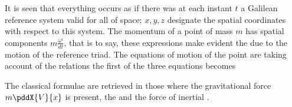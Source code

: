 It is seen that everything occurs as if there was at each instant $t$ a Galilean reference system valid for all of space; $x, y, z$ designate the spatial coordinates with respect to this system. The momentum of a point of mass $m$ has spatial components $m\frac{\omega^i}{dt}$, that is to say,
these expressions make evident the  due to the motion of the reference triad. The equations of motion of the point are
taking account of the relations
the first of the three equations becomes

The classical formulae are retrieved in those where the gravitational force $m\pddX{V}{x}$ is present, the  and the force of inertial . \textit{}